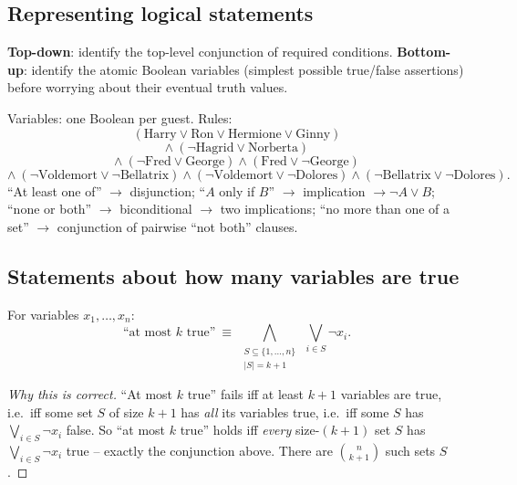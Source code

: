 \subsection{Representing logical statements}
\label{sec:4-18}

\begin{note}
\textbf{Top-down}: identify the top-level conjunction of required conditions. \textbf{Bottom-up}: identify the atomic Boolean variables (simplest possible true/false assertions) before worrying about their eventual truth values.
\end{note}

\begin{example}
Variables: one Boolean per guest. Rules:
\[
(\text{Harry}\vee\text{Ron}\vee\text{Hermione}\vee\text{Ginny})
\]
\[
\wedge\ (\neg\text{Hagrid}\vee\text{Norberta})
\]
\[
\wedge\ (\neg\text{Fred}\vee\text{George}) \wedge (\text{Fred}\vee\neg\text{George})
\]
\[
\wedge\ (\neg\text{Voldemort}\vee\neg\text{Bellatrix})\wedge(\neg\text{Voldemort}\vee\neg\text{Dolores})\wedge(\neg\text{Bellatrix}\vee\neg\text{Dolores}).
\]
``At least one of'' $\to$ disjunction; ``$A$ only if $B$'' $\to$ implication $\to \neg A\vee B$; ``none or both'' $\to$ biconditional $\to$ two implications; ``no more than one of a set'' $\to$ conjunction of pairwise ``not both'' clauses.
\end{example}

\subsection{Statements about how many variables are true}
\label{sec:4-19}

\begin{definition}
For variables $x_1,\dots,x_n$:
\[
\text{``at most } k \text{ true''} \ \equiv\ \bigwedge_{\substack{S\subseteq\{1,\dots,n\} \\ |S|=k+1}} \ \bigvee_{i\in S} \neg x_i.
\]
\end{definition}
\begin{proof}[Why this is correct]
``At most $k$ true'' fails iff at least $k+1$ variables are true, i.e.\ iff some set $S$ of size $k+1$ has \emph{all} its variables true, i.e.\ iff some $S$ has $\bigvee_{i\in S}\neg x_i$ false. So ``at most $k$ true'' holds iff \emph{every} size-$(k{+}1)$ set $S$ has $\bigvee_{i\in S}\neg x_i$ true -- exactly the conjunction above. There are $\binom{n}{k+1}$ such sets $S$.
\end{proof}

